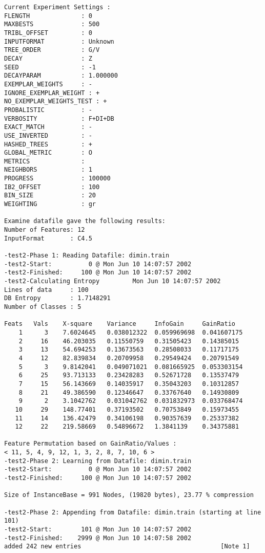 \documentclass{article}
\begin{document}
\begin{verbatim}
Current Experiment Settings :
FLENGTH              : 0
MAXBESTS             : 500
TRIBL_OFFSET         : 0
INPUTFORMAT          : Unknown
TREE_ORDER           : G/V
DECAY                : Z
SEED                 : -1
DECAYPARAM           : 1.000000
EXEMPLAR_WEIGHTS     : -
IGNORE_EXEMPLAR_WEIGHT : +
NO_EXEMPLAR_WEIGHTS_TEST : +
PROBALISTIC          : -
VERBOSITY            : F+DI+DB
EXACT_MATCH          : -
USE_INVERTED         : -
HASHED_TREES         : +
GLOBAL_METRIC        : O
METRICS              : 
NEIGHBORS            : 1
PROGRESS             : 100000
IB2_OFFSET           : 100
BIN_SIZE             : 20
WEIGHTING            : gr

Examine datafile gave the following results:
Number of Features: 12
InputFormat       : C4.5

-test2-Phase 1: Reading Datafile: dimin.train
-test2-Start:          0 @ Mon Jun 10 14:07:57 2002
-test2-Finished:     100 @ Mon Jun 10 14:07:57 2002
-test2-Calculating Entropy         Mon Jun 10 14:07:57 2002
Lines of data     : 100
DB Entropy        : 1.7148291
Number of Classes : 5

Feats   Vals    X-square    Variance     InfoGain     GainRatio
    1      3    7.6024645   0.038012322  0.059969698  0.041607175
    2     16    46.203035   0.11550759   0.31505423   0.14385015
    3     13    54.694253   0.13673563   0.28508033   0.11717175
    4     12    82.839834   0.20709958   0.29549424   0.20791549
    5      3    9.8142041   0.049071021  0.081665925  0.053303154
    6     25    93.713133   0.23428283   0.52671728   0.13537479
    7     15    56.143669   0.14035917   0.35043203   0.10312857
    8     21    49.386590   0.12346647   0.33767640   0.14930809
    9      2    3.1042762   0.031042762  0.031832973  0.033768474
   10     29    148.77401   0.37193502   0.70753849   0.15973455
   11     14    136.42479   0.34106198   0.90357639   0.25337382
   12     22    219.58669   0.54896672   1.3841139    0.34375881

Feature Permutation based on GainRatio/Values :
< 11, 5, 4, 9, 12, 1, 3, 2, 8, 7, 10, 6 >
-test2-Phase 2: Learning from Datafile: dimin.train
-test2-Start:          0 @ Mon Jun 10 14:07:57 2002
-test2-Finished:     100 @ Mon Jun 10 14:07:57 2002

Size of InstanceBase = 991 Nodes, (19820 bytes), 23.77 % compression

-test2-Phase 2: Appending from Datafile: dimin.train (starting at line 101)
-test2-Start:        101 @ Mon Jun 10 14:07:57 2002
-test2-Finished:    2999 @ Mon Jun 10 14:07:58 2002
added 242 new entries                                      [Note 1]


\end{verbatim}
\end{document}
